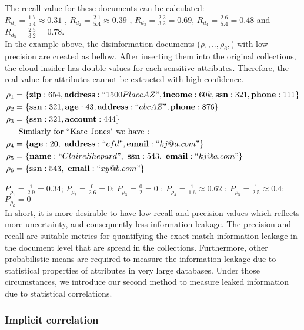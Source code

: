 The recall value for these documents can be calculated:\\ $R_{d_1}=\frac{1.7}{5.4} \approx 0.31$ , $R_{d_2}=\frac{2.1}{5.4} \approx 0.39$ , $R_{d_3}=\frac{2.2}{3.2} = 0.69$, $R_{d_4}=\frac{2.6}{5.4} = 0.48$ and $R_{d_5}=\frac{2.5}{3.2} = 0.78$.\\ 
In the example above, the disinformation documents ($\rho_1,.., \rho_6,$) with low precision are created as bellow. After inserting them into the original collections, the cloud insider has double values for each sensitive attributes. Therefore, the real value for attributes cannot be extracted with high confidence.\\
\begin{align*}
\rho_1&=\{ {\bf zip} : 654, {\bf address} : ``1500 Place AZ", {\bf income} : 60k, {\bf ssn}:321 , {\bf phone} : 111\}\\
\rho_2&=\{ {\bf ssn} : 321, {\bf age} : 43, {\bf address}: ``abc AZ" , {\bf phone} : 876 \}\\
\rho_3&=\{ {\bf ssn} : 321, {\bf account} : 444\}\\
\noalign{Similarly for ``Kate Jones" we have :}
\rho_4&=\{{\bf age} : 20,~ {\bf address}: ``efd",{\bf email}:``kj@a.com"\}\\
\rho_5&=\{ {\bf name} : ``Claire Shepard",~ {\bf ssn} : 543,~{\bf email}:``kj@a.com"\}\\
\rho_6&=\{ {\bf ssn} : 543,~{\bf email}:``xy@b.com"\}\\
\end{align*}

$P_{\rho_1}=\frac{1}{2.9} =	0.34$; $P_{\rho_2}=\frac{0}{2.6}=0$; 
$P_{\rho_3}=\frac{0}{2} = 0$ ; $P_{\rho_4}=\frac{1}{1.6} \approx	0.62$ ; $P_{\rho_5}=\frac{1}{2.5} \approx	0.4$; $P_{\rho_6}=0$ \\

In short, it is more desirable to have low recall and precision values which reflects more uncertainty, and consequently less information leakage. The precision and recall are suitable metrics for quantifying the exact match information leakage in the document level that are spread in the collections. Furthermore, other probabilistic means are required to measure the information leakage due to statistical properties of attributes in very large databases. Under those circumstances, we introduce our second method to measure leaked information due to statistical correlations.


\subsubsection{Implicit correlation}
\label{ImplicitCorrelationSubsection}

